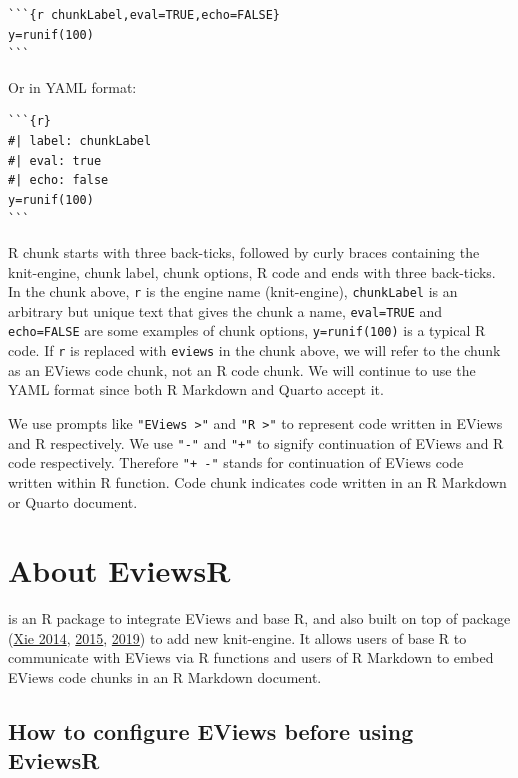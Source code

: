 \begin{verbatim}
```{r chunkLabel,eval=TRUE,echo=FALSE} 
y=runif(100)
```
\end{verbatim}

Or in YAML format:

\begin{verbatim}
```{r} 
#| label: chunkLabel
#| eval: true
#| echo: false
y=runif(100)
```
\end{verbatim}

R chunk starts with three back-ticks, followed by curly braces containing the knit-engine, chunk label, chunk options, R code and ends with three back-ticks. In the chunk above, \texttt{r} is the engine name (knit-engine), \texttt{chunkLabel} is an arbitrary but unique text that gives the chunk a name, \texttt{eval=TRUE} and \texttt{echo=FALSE} are some examples of chunk options, \texttt{y=runif(100)} is a typical R code. If \texttt{r} is replaced with \texttt{eviews} in the chunk above, we will refer to the chunk as an EViews code chunk, not an R code chunk. We will continue to use the YAML format since both R Markdown and Quarto accept it.

We use prompts like \texttt{"EViews\ \textgreater{}"} and \texttt{"R\ \textgreater{}"} to represent code written in EViews and R respectively. We use \texttt{"-"} and \texttt{"+"} to signify continuation of EViews and R code respectively. Therefore \texttt{"+\ -"} stands for continuation of EViews code written within R function. Code chunk indicates code written in an R Markdown or Quarto document.

\hypertarget{sec-eviewsr}{%
\section{About EviewsR}\label{sec-eviewsr}}

 is an R package to integrate EViews and base R, and also built on top of  package (\protect\hyperlink{ref-xie2014}{Xie 2014}, \protect\hyperlink{ref-xie2015}{2015}, \protect\hyperlink{ref-xie2019}{2019}) to add new knit-engine. It allows users of base R to communicate with EViews via R functions and users of R Markdown to embed EViews code chunks in an R Markdown document.

\hypertarget{sec-configuration}{%
\subsection{How to configure EViews before using EviewsR}\label{sec-configuration}}

